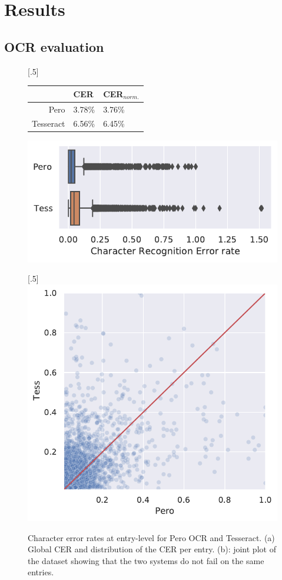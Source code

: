 \section{Results}

\subsection{OCR evaluation}

\begin{figure}

\subcaptionbox{}[.5\linewidth]{
\begin{tabular}{rll}
          & CER & CER$_{norm.}$ \\
\midrule
Pero      & 3.78\% & 3.76\% \\   
Tesseract & 6.56\% & 6.45\% \\
\bottomrule
\end{tabular}

\bigskip

\includegraphics[width=\linewidth]{images/ocr-eval-2.pdf}
}
\subcaptionbox{}[.5\linewidth]{
\includegraphics[width=\linewidth]{images/ocr-eval-1.pdf}
}
\caption{Character error rates at entry-level for Pero OCR and Tesseract. (a) Global CER and distribution of the CER per entry. (b):
joint plot of the dataset showing that the two systems do not fail on the same entries.}  
\end{figure}


